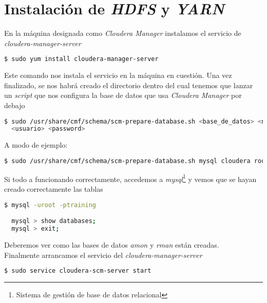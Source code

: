 \clearpage

\section{Instalación de \textit{HDFS} y \textit{YARN}}\label{sec:instalacion_hdfs_yarn}

En la máquina designada como \textit{Cloudera Manager} instalamos el servicio de \textit{cloudera-manager-server}

\begin{lstlisting}[language=bash, numbers=none]
$ sudo yum install cloudera-manager-server
\end{lstlisting}

Este comando nos instala el servicio en la máquina en cuestión. Una vez finalizado, se nos habrá creado el
directorio  dentro del cual tenemos que lanzar un \textit{script} que nos configura la base de 
datos que usa \textit{Cloudera Manager} por debajo

\begin{lstlisting}[language=bash, numbers=none]
$ sudo /usr/share/cmf/schema/scm-prepare-database.sh <base_de_datos> <nombre_db> \
  <usuario> <password>
\end{lstlisting}

A modo de ejemplo:

\begin{lstlisting}[language=bash, numbers=none]
$ sudo /usr/share/cmf/schema/scm-prepare-database.sh mysql cloudera root training
\end{lstlisting}

Si todo a funcionando correctamente, accedemos a \textit{mysql}\footnote{Sistema de gestión de base de datos relacional} y vemos que se hayan creado correctamente las tablas

\begin{lstlisting}[language=bash, numbers=none]
$ mysql -uroot -ptraining

  mysql > show databases;
  mysql > exit;
\end{lstlisting}

Deberemos ver como las bases de datos \textit{amon} y \textit{rman} están creadas.\\
Finalmente arrancamos el servicio del \textit{cloudera-manager-server}

\begin{lstlisting}[language=bash, numbers=none]
$ sudo service cloudera-scm-server start
\end{lstlisting}

